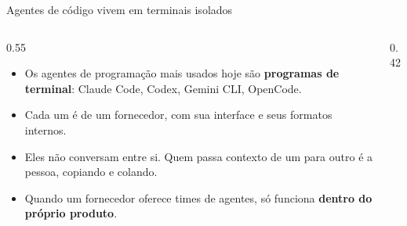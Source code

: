 \documentclass[11pt,aspectratio=169]{beamer}
\begin{document}
\begin{frame}{Agentes de código vivem em terminais isolados}
\begin{columns}[T]
\begin{column}{0.55\linewidth}
\begin{itemize}
\setlength\itemsep{0.6em}
\item Os agentes de programação mais usados hoje são \textbf{programas de terminal}: Claude Code, Codex,
  Gemini CLI, OpenCode.
\item Cada um é de um fornecedor, com sua interface e seus formatos internos.
\item Eles não conversam entre si. Quem passa contexto de um para outro é a pessoa, copiando e colando.
\item Quando um fornecedor oferece times de agentes, só funciona \textbf{dentro do próprio produto}.
\end{itemize}
\end{column}
\begin{column}{0.42\linewidth}
\centering
{}
\end{column}
\end{columns}
\end{frame}
\end{document}
